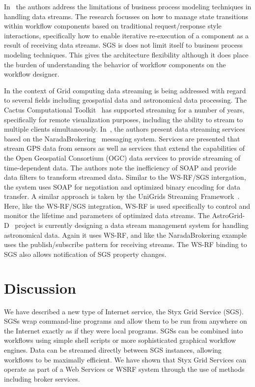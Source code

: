 \documentclass[a4paper]{article}
\begin{document}
In~\cite{bioernstad:2006} the authors address the limitations of business process modeling techniques in handling data streams. The research focusses on how to manage state transitions within workflow components based on traditional request/response style interactions, specifically how to enable iterative re-execution of a component as a result of receiving data streams. SGS is does not limit itself to business process modeling techniques. This gives the architecture flexibility although it does place the burden of understanding the behavior of workflow components on the workflow designer.

In the context of Grid computing data streaming is being addressed with regard to several fields including geospatial data and astronomical data processing. The Cactus Computational Toolkit~\cite{allen:2001} has supported streaming for a number of years, specifically for remote visualization purposes, including the ability to stream to multiple clients simultaneously. In~\cite{fox:2006}, the authors present data streaming services based on the NaradaBrokering~\cite{naradabrokering} messaging system. Services are presented that stream GPS data from sensors as well as services that extend the capabilities of the Open Geospatial Consortium (OGC) data services to provide streaming of time-dependent data. The authors note the inefficiency of SOAP and provide data filters to transform streamed data. Similar to the WS-RF/SGS intergation, the system uses SOAP for negotiation and optimized binary encoding for data transfer. A similar approach is taken by the UniGrids Streaming Framework~\cite{benedyczak:2006}. Here, like the WS-RF/SGS integration, WS-RF is used specifically to control and monitor the lifetime and parameters of optimized data streams. The AstroGrid-D~\cite{astrogrid-d} project is currently designing a data stream management system for handling astronomical data. Again it uses WS-RF, and like the NaradaBrokering example uses the publish/subscribe pattern for receiving streams. The WS-RF binding to SGS also allows notification of SGS property changes.

\section{Discussion}

We have described a new type of Internet service, the Styx Grid Service (SGS).  SGSs wrap command-line programs and allow them to be run from anywhere on the Internet exactly as if they were local programs.  SGSs can be combined into workflows using simple shell scripts or more sophisticated graphical workflow engines.  Data can be streamed directly between SGS instances, allowing workflows to be maximally efficient.  We have shown that Styx Grid Services can operate as part of a Web Services or WSRF system through the use of methods including broker services.
\end{document}
